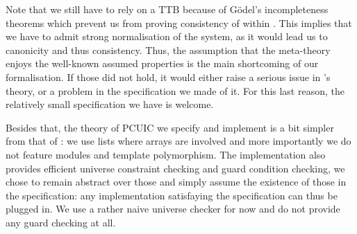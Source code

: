 Note that we still have to rely on a \acrshort{TTB} because of Gödel's
incompleteness theorems which prevent us from proving consistency of
\Coq within \Coq.
This implies that we have to admit strong normalisation of the system, as it
would lead us to canonicity and thus consistency.
Thus, the assumption that the meta-theory enjoys the well-known assumed
properties is the main shortcoming of our formalisation. If those did not hold,
it would either raise a serious issue in \Coq's theory, or a problem in the
specification we made of it. For this last reason, the relatively small
specification we have is welcome.

Besides that, the theory of \acrshort{PCUIC} we specify and implement is a bit
simpler from that of \Coq: we use lists where arrays are involved and more
importantly we do not feature modules and template polymorphism.
The implementation also provides efficient universe constraint checking and
guard condition checking, we chose to remain abstract over those and simply
assume the existence of those in the specification: any implementation
satisfaying the specification can thus be plugged in. We use a rather naive
universe checker for now and do not provide any guard checking at all.